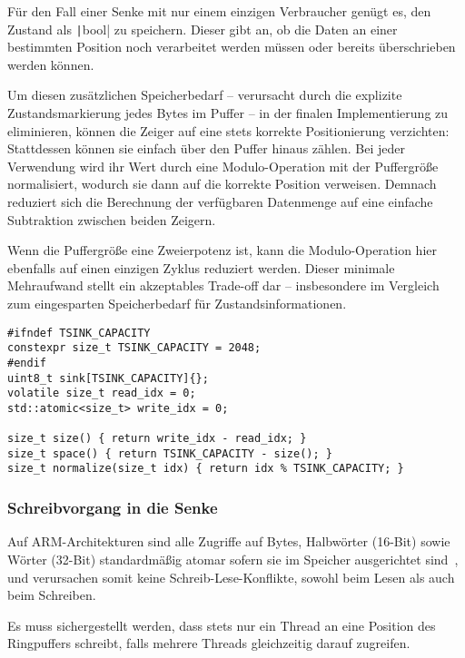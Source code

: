 Für den Fall einer Senke mit nur einem einzigen Verbraucher genügt es, den
Zustand als \texttt|bool| zu speichern. Dieser gibt an, ob die Daten an
einer bestimmten Position noch verarbeitet werden müssen oder bereits
überschrieben werden können.

Um diesen zusätzlichen Speicherbedarf -- verursacht durch die explizite
Zustandsmarkierung jedes Bytes im Puffer -- in der finalen Implementierung zu
eliminieren, können die Zeiger auf eine stets korrekte Positionierung
verzichten: Stattdessen können sie einfach über den Puffer hinaus zählen. Bei
jeder Verwendung wird ihr Wert durch eine Modulo-Operation mit der Puffergröße
normalisiert, wodurch sie dann auf die korrekte Position verweisen. Demnach
reduziert sich die Berechnung der verfügbaren Datenmenge auf eine einfache
Subtraktion zwischen beiden Zeigern.

Wenn die Puffergröße eine Zweierpotenz ist, kann die Modulo-Operation hier
ebenfalls auf einen einzigen Zyklus reduziert werden. Dieser minimale
Mehraufwand stellt ein akzeptables Trade-off dar -- insbesondere im Vergleich
zum eingesparten Speicherbedarf für Zustandsinformationen.

\begin{code}
\begin{verbatim}
#ifndef TSINK_CAPACITY
constexpr size_t TSINK_CAPACITY = 2048;
#endif
uint8_t sink[TSINK_CAPACITY]{};
volatile size_t read_idx = 0;
std::atomic<size_t> write_idx = 0;

size_t size() { return write_idx - read_idx; }
size_t space() { return TSINK_CAPACITY - size(); }
size_t normalize(size_t idx) { return idx % TSINK_CAPACITY; }
\end{verbatim}
\end{code}

\subsubsection{Schreibvorgang in die Senke}

Auf ARM-Architekturen sind alle Zugriffe auf Bytes, Halbwörter (16-Bit) sowie
Wörter (32-Bit) standardmäßig atomar sofern sie im Speicher ausgerichtet
sind~\cite[S. A3-79]{ARM_DDI0403_EE}, und verursachen somit keine
Schreib-Lese-Konflikte, sowohl beim Lesen als auch beim Schreiben.

Es muss sichergestellt werden, dass stets nur ein Thread an eine Position des
Ringpuffers schreibt, falls mehrere Threads gleichzeitig darauf zugreifen.

